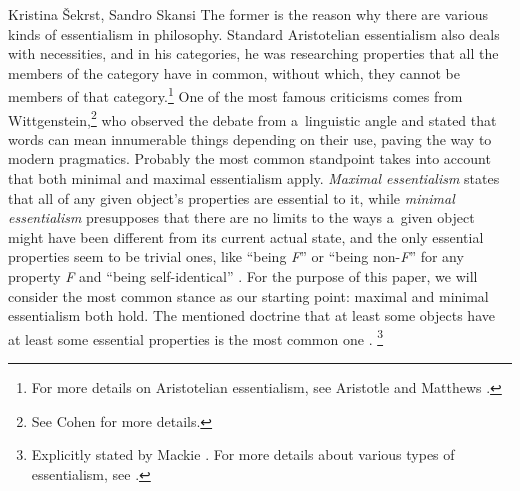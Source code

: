 \begin{artengenv2auth}{Kristina Šekrst, Sandro Skansi}
The former is the reason why there are various kinds of essentialism in philosophy. Standard Aristotelian essentialism also deals with necessities, and in his categories, he was researching properties that all the members of the category have in common, without which, they cannot be members of that category.\footnote{For more details on Aristotelian essentialism, see Aristotle
\parencite*[][]{aristotle_categories_2014} %
 and Matthews 
\parencite*[][]{matthews_aristotelian_1990}.%
} One of the most famous criticisms comes from Wittgenstein,\footnote{See Cohen 
\parencite*[][]{cohen_wittgensteins_1968} %
 for more details.} who observed the debate from a~linguistic angle and stated that words can mean innumerable things depending on their use, paving the way to modern pragmatics. Probably the most common standpoint takes into account that both minimal and maximal essentialism apply. \textit{Maximal essentialism} states that all of any given object's properties are essential to it, while \textit{minimal essentialism} presupposes that there are no limits to the ways a~given object might have been different from its current actual state, and the only essential properties seem to be trivial ones, like ``being \textit{F}'' or ``being non-\textit{F}'' for any property \textit{F} and ``being self-identical'' 
\parencite[][]{robertson_ishii_essential_2020}. %
 For the purpose of this paper, we will consider the most common stance as our starting point: maximal and minimal essentialism both hold. The mentioned doctrine that at least some objects have at least some essential properties is the most common one 
\parencite[][]{robertson_ishii_essential_2020}.%
\footnote{Explicitly stated by Mackie 
\parencite*[][]{mackie_how_2006}. %
 For more details about various types of essentialism, see 
\parencite[][]{robertson_ishii_essential_2020}.%
}


\end{artengenv2auth}
